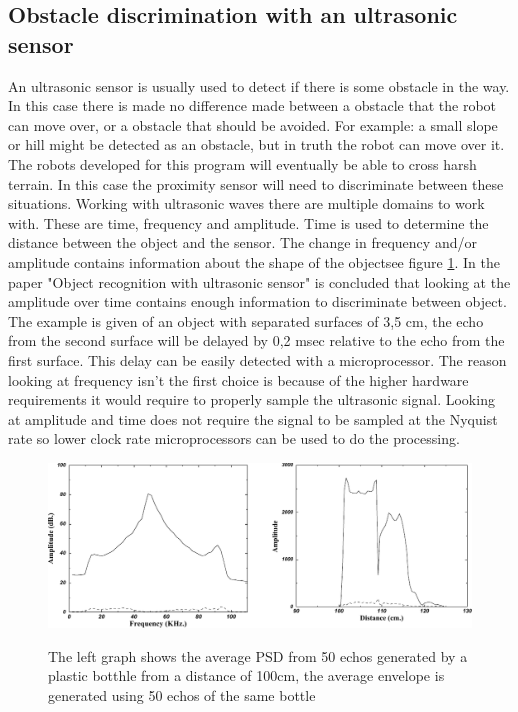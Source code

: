 \documentclass[10pt,a4paper]{article}
\begin{document}
\subsection{Obstacle discrimination with an ultrasonic sensor}
An ultrasonic sensor is usually used to detect if there is some obstacle in the way. In this case there is made no difference made between a obstacle that the robot can move over, or a obstacle that should be avoided. For example: a small slope or hill might be detected as an obstacle, but in truth the robot can move over it. The robots developed for this program will eventually be able to cross harsh terrain. In this case the proximity sensor will need to discriminate between these situations. Working with ultrasonic waves there are multiple domains to work with. These are time, frequency and amplitude. Time is used to determine the distance between the object and the sensor. The change in frequency and/or amplitude contains information about the shape of the object\cite{ultraobject}see figure \ref{ultrafreq}. In the paper "Object recognition with ultrasonic sensor" is concluded that looking at the amplitude over time contains enough information to discriminate between object\cite{ultraobject}. The example is given of an object with separated surfaces of 3,5 cm, the echo from the second surface will be delayed by 0,2 msec relative to the echo from the first surface. This delay can be easily detected with a microprocessor. The reason looking at frequency isn't the first choice is because of the higher hardware requirements it would require to properly sample the ultrasonic signal. Looking at amplitude and time does not require the signal to be sampled at the Nyquist rate so lower clock rate microprocessors can be used to do the processing.
\\
\begin{figure}[h]
  \centering
      \includegraphics[width=1\textwidth]{ultrafreq.pdf}
  \caption{The left graph shows the average PSD from 50 echos generated by a plastic botthle from a distance of 100cm, the average envelope is generated using 50 echos of the same bottle} \cite{ultraobject}  \label{ultrafreq}
\end{figure}
\newpage
\end{document}
